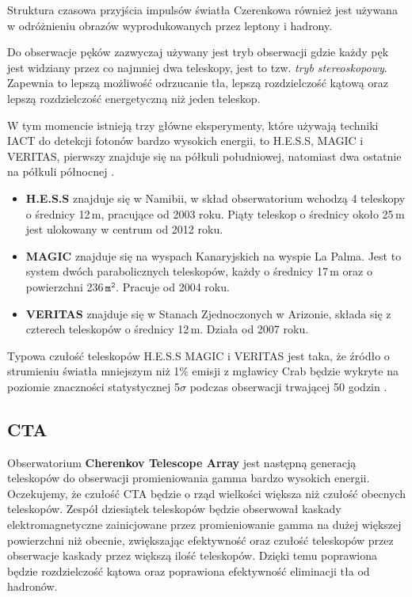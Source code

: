 \documentclass[a4paper,11pt,twoside]{article}
\begin{document}
Struktura czasowa przyjścia impulsów światła Czerenkowa również jest używana w odróżnieniu obrazów wyprodukowanych przez leptony i hadrony. 

Do obserwacje pęków zazwyczaj używany jest tryb obserwacji gdzie każdy pęk jest widziany przez co najmniej dwa teleskopy, jest to tzw. \textsl{tryb stereoskopowy}. Zapewnia to lepszą możliwość odrzucanie tła, lepszą rozdzielczość kątową oraz lepszą rozdzielczość energetyczną niż jeden teleskop.

W tym momencie istnieją trzy główne eksperymenty, które używają techniki IACT do detekcji fotonów bardzo wysokich energii, to H.E.S.S, MAGIC i VERITAS, pierwszy znajduje się na półkuli południowej, natomiast dwa ostatnie na półkuli północnej \cite{particle_de_angelis}. 
\begin{itemize}
\item {\bf{H.E.S.S}} \cite{hess} znajduje się w Namibii, w skład obserwatorium wchodzą 4 teleskopy o średnicy 12\,m, pracujące od 2003 roku. Piąty teleskop o średnicy około 25\,m jest ulokowany w centrum od 2012 roku.
\item {\bf{MAGIC}} \cite{magic} znajduje się na wyspach Kanaryjskich na wyspie La Palma. Jest to system dwóch parabolicznych teleskopów, każdy o średnicy 17\,m oraz o powierzchni 236\,$\mathtt{m^2}$. Pracuje od 2004 roku.
\item {\bf{VERITAS}} \cite{veritas} znajduje się w Stanach Zjednoczonych w Arizonie, składa się z czterech teleskopów o średnicy 12\,m. Działa od 2007 roku.
\end{itemize}
Typowa czułość teleskopów H.E.S.S MAGIC i VERITAS jest taka, że źródło o  strumieniu światła mniejszym niż 1\% emisji z mgławicy Crab będzie wykryte na poziomie znaczności statystycznej 5$\sigma$ podczas obserwacji trwającej 50 godzin \cite{particle_de_angelis}. 
\subsection{CTA}
Obserwatorium {\bf{Cherenkov Telescope Array}} jest następną generacją teleskopów do obserwacji promieniowania gamma bardzo wysokich energii. Oczekujemy, że czułość CTA będzie o rząd wielkości większa niż czułość obecnych teleskopów. 
Zespół dziesiątek teleskopów będzie obserwował kaskady elektromagnetyczne zainicjowane przez promieniowanie gamma na dużej większej powierzchni niż obecnie, zwiększając efektywność oraz czułość teleskopów przez obserwacje kaskady przez większą ilość teleskopów. Dzięki temu poprawiona będzie rozdzielczość kątowa oraz poprawiona efektywność eliminacji tła od hadronów.
\end{document}

